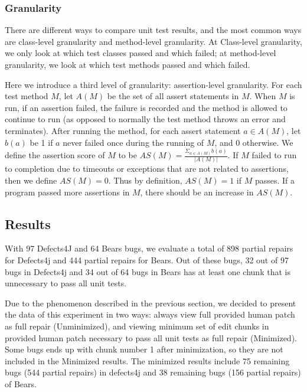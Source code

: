 \documentclass[sigconf, timestamp-false, anonymous=true]{acmart}
\begin{document}
\subsubsection{Granularity}

There are different ways to compare unit test results, and the most common ways 
are class-level granularity and method-level granularity. At Class-level granularity, 
we only look at which test classes passed and which failed; at method-level 
granularity, we look at which test methods passed and which failed.

Here we introduce a third level of granularity: assertion-level granularity. 
For each test method $M$, let $A(M)$ be the set of all assert statements in $M$. 
When $M$ is run, if an assertion failed, the failure is recorded and the method 
is allowed to continue to run (as opposed to normally the test method throws an 
error and terminates). After running the method, for each assert statement 
$a\in A(M)$, let $b(a)$ be 1 if $a$ never failed once during the running of $M$, 
and 0 otherwise. We define the assertion score of $M$ to be 
$AS(M)=\frac{\Sigma_{a\in A(M)}b(a)}{|A(M)|}$. If $M$ failed to run to completion 
due to timeouts or exceptions that are not related to assertions, then we define 
$AS(M)=0$. Thus by definition, $AS(M)=1$ if $M$ passes. If a program passed more 
assertions in $M$, there should be an increase in $AS(M)$.


\subsection{Results}

With 97 Defects4J and 64 Bears bugs, we evaluate
a total of 898 partial repairs for Defects4j and 444 partial repairs for Bears.
Out of these bugs, 32 out of 97 bugs in Defects4j and 
34 out of 64 bugs in Bears has at least one chunk that
is unnecessary to pass all unit tests.

Due to the phenomenon described in the previous section, we decided to present the
data of this experiment in two ways: always view full provided human patch as full repair
(Unminimized), and viewing minimum set of edit chunks in provided human patch necessary
to pass all unit tests as full repair (Minimized).
Some bugs ends up with chunk number 1 after minimization, 
so they are not included in the Minimized results. The minimized results 
include 75 remaining bugs (544 partial repairs) in defects4j and 38 remaining bugs (156 partial repairs) of Bears. 
\end{document}
